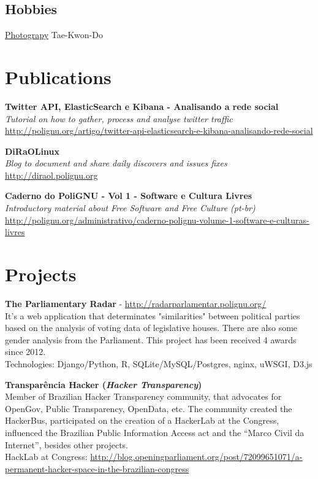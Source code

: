 \documentclass[]{friggeri-cv}
\begin{document}
\begin{aside}
  \section{Hobbies}
      \href{http://olhares.com/diraol}{Photograpy}
      Tae-Kwon-Do
\end{aside}

\section{Publications}
\textbf{Twitter API, ElasticSearch e Kibana - Analisando a rede social}\\
\emph{Tutorial on how to gather, process and analyse twitter traffic}\\
\href{http://polignu.org/artigo/twitter-api-elasticsearch-e-kibana-analisando-rede-social}{http://polignu.org/artigo/twitter-api-elasticsearch-e-kibana-analisando-rede-social}

\textbf{DiRaOLinux}\\
\emph{Blog to document and share daily discovers and issues fixes}\\
\href{http://diraol.polignu.org}{http://diraol.polignu.org}

\textbf{Caderno do PoliGNU - Vol 1 - Software e Cultura Livres}\\
\emph{Introductory material about Free Software and Free Culture (pt-br)}\\
\href{http://polignu.org/administrativo/caderno-polignu-volume-1-software-e-culturas-livres}{http://polignu.org/administrativo/caderno-polignu-volume-1-software-e-culturas-livres}

\section{Projects}
\textbf{The Parliamentary Radar} - \href{http://radarparlamentar.polignu.org/}{http://radarparlamentar.polignu.org/}\\
It's a web application that determinates "similarities" between political parties based on the analysis of voting data of legislative houses. There are also some gender analysis from the Parliament. 
This project has been received 4 awards since 2012.\\
Technologies: Django/Python, R, SQLite/MySQL/Postgres, nginx, uWSGI, D3.js

\textbf{Transparência Hacker (\textit{Hacker Transparency})}\\
Member of Brazilian Hacker Transparency community, that advocates for OpenGov, Public Transparency, OpenData, etc. The community created the HackerBus, participated on the creation of a HackerLab at the Congress, influenced the Brazilian Public Information Access act and the ``Marco Civil da Internet'', besides other projects.\\
HackLab at Congress: \href{http://blog.openingparliament.org/post/72099651071/a-permanent-hacker-space-in-the-brazilian-congress}{http://blog.openingparliament.org/post/72099651071/a-permanent-hacker-space-in-the-brazilian-congress}
\end{document}
